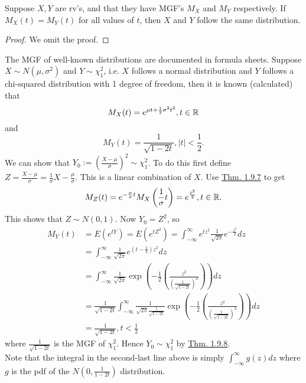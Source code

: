 \documentclass[11pt,fleqn]{book} %
\begin{document}
\begin{theorem} \label{thm:198}
Suppose \(X, Y\) are rv's, and that they have MGF's \(M_X\) and \(M_Y\) respectively. If \(M_X(t) = M_Y(t)\) for all values of \(t\), then \(X\) and \(Y\) follow the same distribution.
\end{theorem}
\begin{proof} We omit the proof. \end{proof}

\begin{example} The MGF of well-known distributions are documented in formula sheets. Suppose \(X \sim N(\mu, \sigma^2)\) and \(Y \sim \chi_{1}^2\), i.e. \(X\) follows a normal distribution and \(Y\) follows a chi-squared distribution with 1 degree of freedom, then it is known (calculated) that
\[
M_X(t) = e^{\mu t + \frac 1 2 \sigma^2 t^2}, t \in \mathbb{R}
\]
and
\[
M_Y(t) = \frac{1}{\sqrt{1 - 2t}}, |t| < \frac 1 2.
\]
\indent We can show that \(Y_0 := \left(\frac{X - \mu}{\sigma}\right)^2 \sim \chi_1^2\). To do this first define \(Z = \frac{X - \mu}{\sigma} = \frac{1}{\sigma}X - \frac{\mu}{\sigma}\). This is a linear combination of \(X\). Use \hyperref[thm:197]{Thm. 1.9.7} to get
\[
M_Z(t) = e^{-\frac{\mu}{\sigma}t}M_X\left(\frac1\sigma t\right) = e^{\frac{t^2}{2}}, t \in \mathbb{R}.
\]
\indent This shows that \(Z \sim N(0, 1)\). Now \(Y_0 = Z^2\), so
\[
\begin{aligned}
M_Y(t) &= E(e^{tY}) = E(e^{tZ^2}) = \int_{-\infty}^\infty e^{tz^2}\frac{1}{\sqrt{2\pi}}e^{-\frac{z^2}{2}} dz\\
&= \int_{-\infty}^\infty \frac{1}{\sqrt{2\pi}}e^{\left(t - \frac 1 2\right)z^2} dz \\
&= \int_{-\infty}^\infty \frac{1}{\sqrt{2\pi}}\exp\left(-\frac 1 2\left(\frac{z^2}{\left(\frac{1}{\sqrt{1 - 2t}}\right)^2}\right)\right)dz \\
&= \frac{1}{\sqrt{1 - 2t}}\int_{-\infty}^\infty \frac{1}{\sqrt{2\pi}\frac{1}{\sqrt{1 - 2t}}}\exp\left(-\frac 1 2 \left(\frac{z^2}{\left(\frac{1}{\sqrt{1 - 2t}}\right)^2}\right)\right)dz \\
&= \frac{1}{\sqrt{1 - 2t}}, t < \frac 1 2
\end{aligned}
\]
where \(\frac{1}{\sqrt{1 - 2t}}\) is the MGF of \(\chi_1^2\). Hence \(Y_0 \sim \chi_1^2\) by \hyperref[thm:198]{Thm. 1.9.8}.\\
\indent Note that the integral in the second-last line above is simply \(\int_{-\infty}^\infty g(z)dz\) where \(g\) is the pdf of the \(N\left(0, \frac{1}{1 - 2t}\right)\) distribution.
\end{example}
\end{document}
